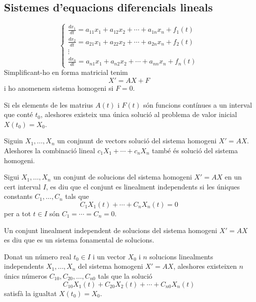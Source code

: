 \documentclass[../main.tex]{subfiles}
\begin{document}
\subsection{Sistemes d'equacions diferencials lineals}
\begin{displaymath}
	\begin{cases}
       \frac{dx_1}{dt} = a_{11}x_1 + a_{12}x_2 + \cdots + a_{1n}x_n + f_1(t)\\
       \frac{dx_2}{dt} = a_{21}x_1 + a_{22}x_2 + \cdots + a_{2n}x_n + f_2(t)\\
       \vdots\\
       \frac{dx_n}{dt} = a_{n1}x_1 + a_{n2}x_2 + \cdots + a_{nn}x_n + f_n(t)
    \end{cases}
\end{displaymath}
Simplificant-ho en forma matricial tenim
\begin{displaymath}
	X' = AX + F
\end{displaymath}
i ho anomenem sistema homogeni si $F = 0$.
\begin{teorema}
Si els elements de les matrius $A(t)$ i $F(t)$ són funcions contínues a un interval que conté $t_0$, aleshores existeix una única solució al problema de valor inicial $X(t_0) = X_0$.
\end{teorema}
\begin{proposicio}
	Siguin $X_1, \dots, X_n$ un conjnunt de vectors solució del sistema homogeni $X' = AX$. Aleshores la combinació lineal $c_1X_1 + \cdots + c_nX_n$ també és solució del sistema homogeni.
\end{proposicio}
\begin{definicio}
Sigui $X_1, \dots, X_n$ un conjunt de solucions del sistema homogeni $X' = AX$ en un cert interval $I$, es diu que el conjunt es linealment independents si les úniques constants $C_1, \dots, C_n$ tals que
\begin{displaymath}
	C_1X_1(t) + \cdots + C_nX_n(t) = 0
\end{displaymath}
per a tot $t \in I$ són $C_1 = \cdots = C_n = 0$.
\end{definicio}
\begin{definicio}
Un conjunt linealment independent de solucions del sistema homogeni $X' = AX$ es diu que es un sistema fonamental de solucions.
\end{definicio}
\begin{proposicio}
Donat un número real $t_0 \in I$ i un vector $X_0$ i $n$ solucions linealments independents $X_1, \dots, X_n$ del sistema homogeni $X' = AX$, aleshores existeixen $n$ únics números $C_{10}, C_{20}, \dots, C_{n0}$ tals que la solució
\begin{displaymath}
    C_{10}X_1(t) + C_{20}X_2(t) + \cdots + C_{n0}X_n(t)
\end{displaymath}
satisfà la igualtat $X(t_0) = X_0$.
\end{proposicio}
\end{document}
